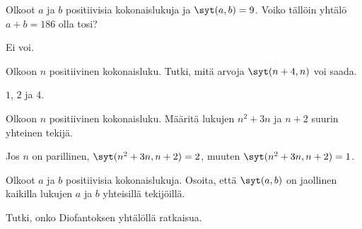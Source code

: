 \begin{tehtava}
    Olkoot $a$ ja $b$ positiivisia kokonaislukuja ja $\syt(a, b)=9$. Voiko tällöin yhtälö $a + b = 186$ olla tosi?
    
    \begin{vastaus}
        Ei voi.
    \end{vastaus}
    
\end{tehtava}

\begin{tehtava}
    Olkoon $n$ positiivinen kokonaisluku. Tutki, mitä arvoja $\syt(n+4, n)$ voi saada.
    
    \begin{vastaus}
        $1$, $2$ ja $4$.
    \end{vastaus}
    
\end{tehtava}

\begin{tehtava}
    Olkoon $n$ positiivinen kokonaisluku. Määritä lukujen $n^2 + 3n$ ja $n + 2$ suurin yhteinen tekijä.
    
    \begin{vastaus}
        Jos $n$ on parillinen, $\syt(n^2 + 3n, n + 2) = 2$, muuten $\syt(n^2 + 3n, n + 2) = 1$.
    \end{vastaus}
    
\end{tehtava}

\begin{tehtava}
    Olkoot $a$ ja $b$ positiivisia kokonaislukuja. Osoita, että $\syt(a, b)$ on jaollinen kaikilla lukujen $a$ ja $b$ yhteisillä tekijöillä.
\end{tehtava}

\begin{tehtava}
    Tutki, onko Diofantoksen yhtälöllä ratkaisua.
    
    \begin{alakohdat}
    \end{alakohdat}

    \begin{vastaus}
        \begin{alakohdat}
        \end{alakohdat}
    \end{vastaus}
    
\end{tehtava}

